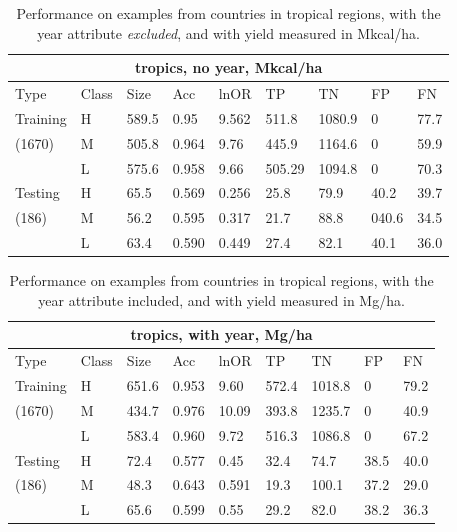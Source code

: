 \documentclass[11pt]{article}
\begin{document}
\begin{table}[h!]
\centering
\begin{tabular}{lllllllll}
\toprule
\multicolumn{9}{c}{\textbf{tropics, no year, Mkcal/ha}} \\
\midrule
Type & Class & Size & Acc & lnOR & TP & TN & FP & FN \\
\midrule
Training & H & 589.5 & 0.95 & 9.562 & 511.8 & 1080.9 & 0 & 77.7  \\
(1670) & M & 505.8 & 0.964 & 9.76 & 445.9 & 1164.6 & 0 & 59.9  \\
& L & 575.6 & 0.958 & 9.66 & 505.29 & 1094.8 & 0 & 70.3  \\
Testing & H & 65.5 & 0.569 & 0.256 & 25.8 & 79.9 & 40.2 & 39.7  \\
(186) & M & 56.2 & 0.595 & 0.317 & 21.7 & 88.8 & 040.6 & 34.5  \\
& L & 63.4 & 0.590 & 0.449 & 27.4 & 82.1 & 40.1 & 36.0  \\
\bottomrule
\end{tabular}
\caption{Performance on examples from countries in tropical regions, with the year attribute \emph{excluded}, and with yield measured in Mkcal/ha.}
\label{k.ny.trop_results}
\end{table}

\begin{table}[h!]
\centering
\begin{tabular}{lllllllll}
\toprule
\multicolumn{9}{c}{\textbf{tropics, with year, Mg/ha}} \\
\midrule
Type & Class & Size & Acc & lnOR & TP & TN & FP & FN\\
\midrule
Training & H & 651.6 & 0.953 & 9.60 & 572.4 & 1018.8 & 0 & 79.2  \\
(1670) & M & 434.7 & 0.976 & 10.09 & 393.8 & 1235.7 & 0 & 40.9  \\
& L & 583.4 & 0.960 & 9.72 & 516.3 & 1086.8 & 0 & 67.2  \\
Testing & H & 72.4 & 0.577 & 0.45 & 32.4 & 74.7 & 38.5 & 40.0  \\
(186) & M & 48.3 & 0.643 & 0.591 & 19.3 & 100.1 & 37.2 & 29.0  \\
& L & 65.6 & 0.599 & 0.55 & 29.2 & 82.0 & 38.2 & 36.3  \\
\bottomrule
\end{tabular}
\caption{Performance on examples from countries in tropical regions, with the year attribute included, and with yield measured in Mg/ha.}
\label{t.wy.trop_results}
\end{table}
\end{document}

